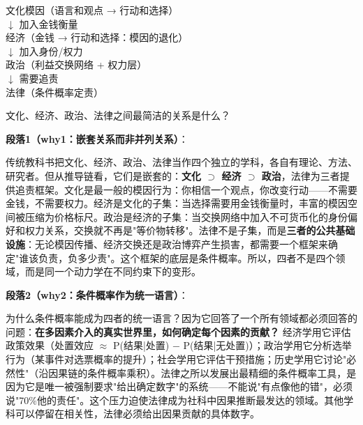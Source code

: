\documentclass[../main.tex]{subfiles}
\begin{document}
	\begin{logicmap}

		文化模因（语言和观点 → 行动和选择）\\

		$\downarrow$ 加入金钱衡量\\

		经济（金钱 → 行动和选择：模因的退化）\\

		$\downarrow$ 加入身份/权力\\

		政治（利益交换网络 + 权力层）\\

		$\downarrow$ 需要追责\\

		法律（条件概率定责）

	\end{logicmap}

	\begin{questionbox}

		文化、经济、政治、法律之间最简洁的关系是什么？

	\end{questionbox}

	\textbf{段落1（why1：嵌套关系而非并列关系）}：  

	传统教科书把文化、经济、政治、法律当作四个独立的学科，各自有理论、方法、研究者。但从推导链看，它们是嵌套的：\textbf{文化 $\supset$ 经济 $\supset$ 政治}，法律为三者提供追责框架。文化是最一般的模因行为：你相信一个观点，你改变行动——不需要金钱，不需要权力。经济是文化的子集：当选择需要用金钱衡量时，丰富的模因空间被压缩为价格标尺。政治是经济的子集：当交换网络中加入不可货币化的身份偏好和权力关系，交换就不再是"等价物转移"。法律不是子集，而是\textbf{三者的公共基础设施}：无论模因传播、经济交换还是政治博弈产生损害，都需要一个框架来确定"谁该负责，负多少责"。这个框架的底层是条件概率。所以，四者不是四个领域，而是同一个动力学在不同约束下的变形。

	\textbf{段落2（why2：条件概率作为统一语言）}：  

	为什么条件概率能成为四者的统一语言？因为它回答了一个所有领域都必须回答的问题：\textbf{在多因素介入的真实世界里，如何确定每个因素的贡献？} 经济学用它评估政策效果（处置效应 $\approx$ P(结果|处置) − P(结果|无处置)）；政治学用它分析选举行为（某事件对选票概率的提升）；社会学用它评估干预措施；历史学用它讨论"必然性"（沿因果链的条件概率乘积）。法律之所以发展出最精细的条件概率工具，是因为它是唯一被强制要求"给出确定数字"的系统——不能说"有点像他的错"，必须说"70\%他的责任"。这个压力迫使法律成为社科中因果推断最发达的领域。其他学科可以停留在相关性，法律必须给出因果贡献的具体数字。
\end{document}
